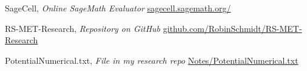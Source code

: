 \documentclass[12pt]{article}
\begin{document}
\begin{thebibliography}{9}
	
 SageCell, \textit{Online SageMath Evaluator}
\href{https://sagecell.sagemath.org/}{sagecell.sagemath.org/}

 RS-MET-Research, \textit{Repository on GitHub}
\href{https://github.com/RobinSchmidt/RS-MET-Research}{github.com/RobinSchmidt/RS-MET-Research}

 PotentialNumerical.txt, \textit{File in my research repo}
\href{https://github.com/RobinSchmidt/RS-MET-Research/blob/master/Notes/PotentialNumerical.txt}{Notes/PotentialNumerical.txt}

\end{thebibliography}
 
 
\end{document}
